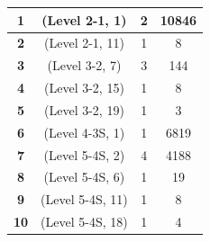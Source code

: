 \begin{table}
\begin{tabular}{cccc}
\textbf{1}              & (Level 2-1, 1)                                                                      & 2                                                                           & 10846                                                                          \\ \hline
\textbf{2}              & (Level 2-1, 11)                                                                     & 1                                                                           & 8                                                                              \\ \hline
\textbf{3}              & (Level 3-2, 7)                                                                      & 3                                                                           & 144                                                                            \\ \hline
\textbf{4}              & (Level 3-2, 15)                                                                     & 1                                                                           & 8                                                                              \\ \hline
\textbf{5}              & (Level 3-2, 19)                                                                     & 1                                                                           & 3                                                                              \\ \hline
\textbf{6}              & (Level 4-3S, 1)                                                                      & 1                                                                           & 6819                                                                           \\ \hline
\textbf{7}              & (Level 5-4S, 2)                                                                      & 4                                                                           & 4188                                                                           \\ \hline
\textbf{8}              & (Level 5-4S, 6)                                                                      & 1                                                                           & 19                                                                             \\ \hline
\textbf{9}              & (Level 5-4S, 11)                                                                     & 1                                                                           & 8                                                                              \\ \hline
\textbf{10}             & (Level 5-4S, 18)                                                                     & 1                                                                           & 4                                                                              \\ \hline\midrule
\end{tabular}
\end{table}


